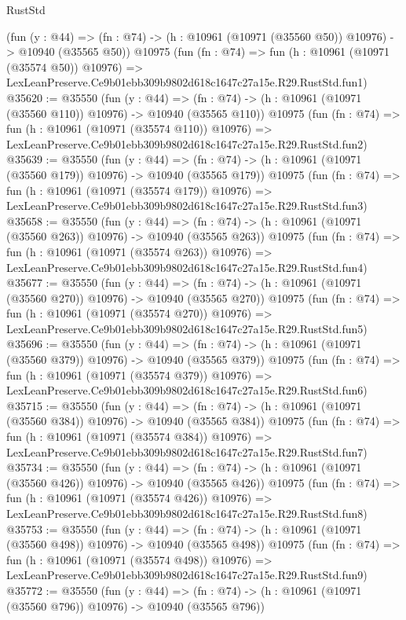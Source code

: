 \begin{lexlean}{RustStd}
\begin{coremodule}
    (fun (y : @44) =>
    (fn : @74) -> (h : @10961 (@10971 (@35560 @50)) @10976) -> @10940 (@35565 @50))
    @10975
    (fun (fn : @74) =>
    fun (h : @10961 (@10971 (@35574 @50)) @10976) =>
    LexLeanPreserve.Ce9b01ebb309b9802d618c1647c27a15e.R29.RustStd.fun1)
@35620 := @35550
    (fun (y : @44) =>
    (fn : @74) -> (h : @10961 (@10971 (@35560 @110)) @10976) -> @10940 (@35565 @110))
    @10975
    (fun (fn : @74) =>
    fun (h : @10961 (@10971 (@35574 @110)) @10976) =>
    LexLeanPreserve.Ce9b01ebb309b9802d618c1647c27a15e.R29.RustStd.fun2)
@35639 := @35550
    (fun (y : @44) =>
    (fn : @74) -> (h : @10961 (@10971 (@35560 @179)) @10976) -> @10940 (@35565 @179))
    @10975
    (fun (fn : @74) =>
    fun (h : @10961 (@10971 (@35574 @179)) @10976) =>
    LexLeanPreserve.Ce9b01ebb309b9802d618c1647c27a15e.R29.RustStd.fun3)
@35658 := @35550
    (fun (y : @44) =>
    (fn : @74) -> (h : @10961 (@10971 (@35560 @263)) @10976) -> @10940 (@35565 @263))
    @10975
    (fun (fn : @74) =>
    fun (h : @10961 (@10971 (@35574 @263)) @10976) =>
    LexLeanPreserve.Ce9b01ebb309b9802d618c1647c27a15e.R29.RustStd.fun4)
@35677 := @35550
    (fun (y : @44) =>
    (fn : @74) -> (h : @10961 (@10971 (@35560 @270)) @10976) -> @10940 (@35565 @270))
    @10975
    (fun (fn : @74) =>
    fun (h : @10961 (@10971 (@35574 @270)) @10976) =>
    LexLeanPreserve.Ce9b01ebb309b9802d618c1647c27a15e.R29.RustStd.fun5)
@35696 := @35550
    (fun (y : @44) =>
    (fn : @74) -> (h : @10961 (@10971 (@35560 @379)) @10976) -> @10940 (@35565 @379))
    @10975
    (fun (fn : @74) =>
    fun (h : @10961 (@10971 (@35574 @379)) @10976) =>
    LexLeanPreserve.Ce9b01ebb309b9802d618c1647c27a15e.R29.RustStd.fun6)
@35715 := @35550
    (fun (y : @44) =>
    (fn : @74) -> (h : @10961 (@10971 (@35560 @384)) @10976) -> @10940 (@35565 @384))
    @10975
    (fun (fn : @74) =>
    fun (h : @10961 (@10971 (@35574 @384)) @10976) =>
    LexLeanPreserve.Ce9b01ebb309b9802d618c1647c27a15e.R29.RustStd.fun7)
@35734 := @35550
    (fun (y : @44) =>
    (fn : @74) -> (h : @10961 (@10971 (@35560 @426)) @10976) -> @10940 (@35565 @426))
    @10975
    (fun (fn : @74) =>
    fun (h : @10961 (@10971 (@35574 @426)) @10976) =>
    LexLeanPreserve.Ce9b01ebb309b9802d618c1647c27a15e.R29.RustStd.fun8)
@35753 := @35550
    (fun (y : @44) =>
    (fn : @74) -> (h : @10961 (@10971 (@35560 @498)) @10976) -> @10940 (@35565 @498))
    @10975
    (fun (fn : @74) =>
    fun (h : @10961 (@10971 (@35574 @498)) @10976) =>
    LexLeanPreserve.Ce9b01ebb309b9802d618c1647c27a15e.R29.RustStd.fun9)
@35772 := @35550
    (fun (y : @44) =>
    (fn : @74) -> (h : @10961 (@10971 (@35560 @796)) @10976) -> @10940 (@35565 @796))

\end{coremodule}
\end{lexlean}
